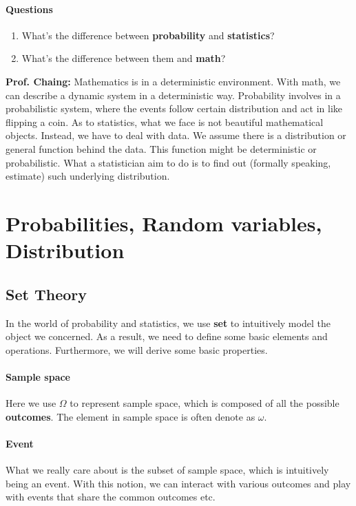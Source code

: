 \documentclass[Probability Theory.tex]{subfiles}
\begin{document}
\paragraph{Questions}
\begin{enumerate}
	\item What's the difference between {\bf probability} and {\bf statistics}?
	\item What's the difference between them and {\bf math}?
\end{enumerate}
{\bf Prof. Chaing:}
Mathematics is in a  {\color{red} deterministic}  environment. With math, we can describe a dynamic system in a deterministic way. Probability involves in a probabilistic system, where the events follow certain distribution and act in like flipping a coin. As to statistics, what we face is not beautiful mathematical objects. Instead, we have to deal with {\color{red} data}. We assume there is a distribution or general function behind the data. This function might be deterministic or probabilistic. What a statistician aim to do is to find out (formally speaking, estimate) such underlying distribution.

\section{Probabilities, Random variables, Distribution}
\subsection{Set Theory}
In the world of probability and statistics, we use {\bf set} to intuitively model the object we concerned. As a result, we need to define some basic elements and operations. Furthermore, we will derive some basic properties.
\paragraph{Sample space}
Here we use $\Omega$ to represent sample space, which is composed of all the possible {\bf outcomes}. The element in sample space is often denote as $\omega$.
\paragraph{Event}
What we really care about is the subset of sample space, which is intuitively being an event. With this notion, we can interact with various outcomes and play with events that share the common outcomes etc.
\end{document}
